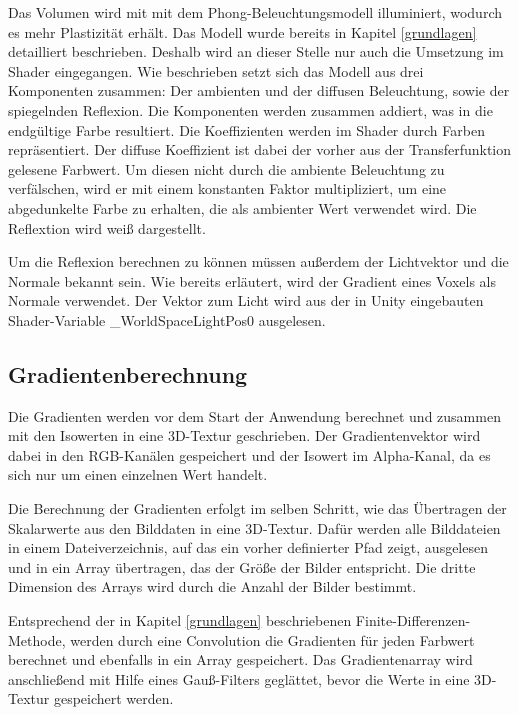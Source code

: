 Das Volumen wird mit mit dem Phong-Beleuchtungsmodell illuminiert, wodurch es mehr Plastizität erhält. Das Modell wurde bereits in Kapitel \ref{grundlagen} detailliert beschrieben. Deshalb wird an dieser Stelle nur auch die Umsetzung im Shader eingegangen.
Wie beschrieben setzt sich das Modell aus drei Komponenten zusammen: Der ambienten und der diffusen Beleuchtung, sowie der spiegelnden Reflexion. Die Komponenten werden zusammen addiert, was in die endgültige Farbe resultiert. 
Die Koeffizienten werden im Shader durch Farben repräsentiert. Der diffuse Koeffizient ist dabei der vorher aus der Transferfunktion gelesene Farbwert. Um diesen nicht durch die ambiente Beleuchtung zu verfälschen, wird er mit einem konstanten Faktor multipliziert, um eine abgedunkelte Farbe zu erhalten, die als ambienter Wert verwendet wird. Die Reflextion wird weiß dargestellt.

Um die Reflexion berechnen zu können müssen außerdem der Lichtvektor und die Normale bekannt sein.
Wie bereits erläutert, wird der Gradient eines Voxels als Normale verwendet. 
Der Vektor zum Licht wird aus der in Unity eingebauten Shader-Variable \_WorldSpaceLightPos0 ausgelesen.

\subsection{Gradientenberechnung}
\label{gradienten}


Die Gradienten werden vor dem Start der Anwendung berechnet und zusammen mit den Isowerten in eine 3D-Textur geschrieben. Der Gradientenvektor wird dabei in den RGB-Kanälen gespeichert und der Isowert im Alpha-Kanal, da es sich nur um einen einzelnen Wert handelt. 

Die Berechnung der Gradienten erfolgt im selben Schritt, wie das Übertragen der Skalarwerte aus den Bilddaten in eine 3D-Textur.
Dafür werden alle Bilddateien in einem Dateiverzeichnis, auf das ein vorher definierter Pfad zeigt, ausgelesen und in ein Array übertragen, das der Größe der Bilder entspricht. Die dritte Dimension des Arrays wird durch die Anzahl der Bilder bestimmt. 

Entsprechend der in Kapitel \ref{grundlagen} beschriebenen Finite-Differenzen-Methode, werden durch eine Convolution die Gradienten für jeden Farbwert berechnet und ebenfalls in ein Array gespeichert.
Das Gradientenarray wird anschließend mit Hilfe eines Gauß-Filters geglättet, bevor die Werte in eine 3D-Textur gespeichert werden. 

